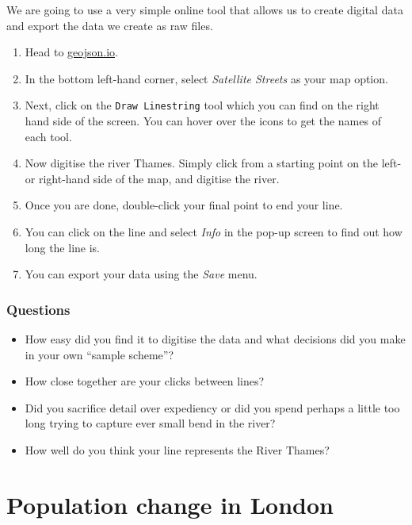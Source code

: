 \documentclass[
]{book}
\providecommand{\tightlist}{%
  \setlength{\itemsep}{0pt}\setlength{\parskip}{0pt}}
\begin{document}
We are going to use a very simple online tool that allows us to create digital data and export the data we create as raw files.

\begin{enumerate}
\def\labelenumi{\arabic{enumi}.}
\tightlist
\item
  Head to \href{http://geojson.io/\#map=12/51.5170/-0.1030}{geojson.io}.
\item
  In the bottom left-hand corner, select \emph{Satellite Streets} as your map option.
\item
  Next, click on the \texttt{Draw\ Linestring} tool which you can find on the right hand side of the screen. You can hover over the icons to get the names of each tool.
\item
  Now digitise the river Thames. Simply click from a starting point on the left- or right-hand side of the map, and digitise the river.
\item
  Once you are done, double-click your final point to end your line.
\item
  You can click on the line and select \emph{Info} in the pop-up screen to find out how long the line is.
\item
  You can export your data using the \emph{Save} menu.
\end{enumerate}

\hypertarget{questions}{%
\subsubsection*{Questions}\label{questions}}

\begin{itemize}
\tightlist
\item
  How easy did you find it to digitise the data and what decisions did you make in your own ``sample scheme''?
\item
  How close together are your clicks between lines?
\item
  Did you sacrifice detail over expediency or did you spend perhaps a little too long trying to capture ever small bend in the river?
\item
  How well do you think your line represents the River Thames?
\end{itemize}

\hypertarget{population-change-in-london}{%
\section{Population change in London}\label{population-change-in-london}}
\end{document}
